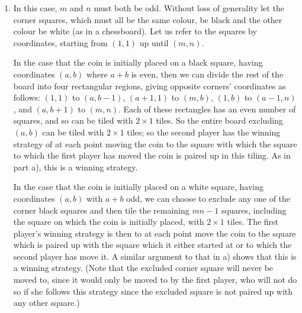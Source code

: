\documentclass[a4paper, 12pt]{article}
\begin{document}
\begin{enumerate}
\begin{enumerate}
\item In this case, $m$ and $n$ must both be odd. Without loss of generality let the corner squares, which must all be the same colour, be black and the other colour be white (as in a chessboard). Let us refer to the squares by coordinates, starting from $(1, 1)$ up until $(m, n)$.

In the case that the coin is initially placed on a black square, having coordinates $(a, b)$ where $a + b$ is even, then we can divide the rest of the board into four rectangular regions, giving opposite corners' coordinates as follows: $(1, 1)$ to $(a, b - 1)$, $(a + 1, 1)$ to $(m, b)$, $(1, b)$ to $(a - 1, n)$, and $(a, b + 1)$ to $(m, n)$. Each of these rectangles has an even number of squares, and so can be tiled with $2 \times 1$ tiles. So the entire board excluding $(a, b)$ can be tiled with $2 \times 1$ tiles; so the second player has the winning strategy of at each point moving the coin to the square with which the square to which the first player has moved the coin is paired up in this tiling. As in part a), this is a winning strategy.

In the case that the coin is initially placed on a white square, having coordinates $(a, b)$ with $a + b$ odd, we can choose to exclude any one of the corner black squares and then tile the remaining $mn - 1$ squares, including the square on which the coin is initially placed, with $2 \times 1$ tiles. The first player's winning strategy is then to at each point move the coin to the square which is paired up with the square which it either started at or to which the second player has move it. A similar argument to that in a) shows that this is a winning strategy. (Note that the excluded corner square will never be moved to, since it would only be moved to by the first player, who will not do so if she follows this strategy since the excluded square is not paired up with any other square.)

\end{enumerate}


\end{enumerate}

\vfill

\centering

\vspace{12mm}
\end{document}
